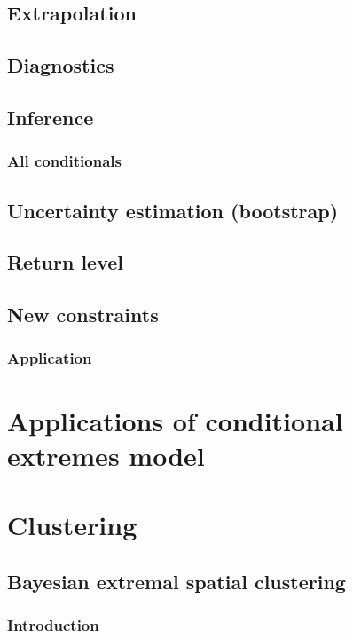 \documentclass{article}
\begin{document}
\subsection{Extrapolation}

\subsection{Diagnostics}

\subsection{Inference}

\subsubsection{All conditionals}

\subsection{Uncertainty estimation (bootstrap)}

\subsection{Return level}

\subsection{New constraints}

\subsubsection{Application}

\section{Applications of conditional extremes model}

\section{Clustering}

\subsection{Bayesian extremal spatial clustering}
\subsubsection{Introduction}
\end{document}
